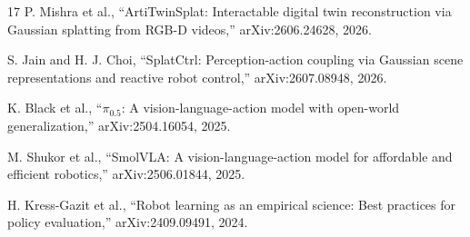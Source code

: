 \documentclass[letterpaper,10pt,conference]{ieeeconf}
\begin{document}
\begin{thebibliography}{17}
P. Mishra et al., ``ArtiTwinSplat: Interactable digital twin reconstruction via
Gaussian splatting from RGB-D videos,'' arXiv:2606.24628, 2026.

S. Jain and H. J. Choi, ``SplatCtrl: Perception-action coupling via Gaussian
scene representations and reactive robot control,'' arXiv:2607.08948, 2026.

K. Black et al., ``$\pi_{0.5}$: A vision-language-action model with open-world
generalization,'' arXiv:2504.16054, 2025.

M. Shukor et al., ``SmolVLA: A vision-language-action model for affordable and
efficient robotics,'' arXiv:2506.01844, 2025.

H. Kress-Gazit et al., ``Robot learning as an empirical science: Best practices
for policy evaluation,'' arXiv:2409.09491, 2024.

\end{thebibliography}

\end{document}
